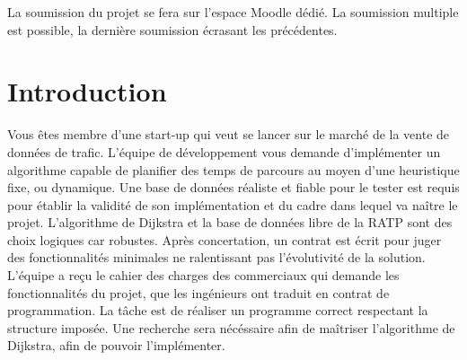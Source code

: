 \documentclass[9pts]{article}
\renewcommand{\headrulewidth}{0pt}
\begin{document}
La soumission du projet se fera sur l'espace Moodle dédié. La soumission multiple est possible, la dernière soumission écrasant les précédentes.

\pagebreak
\renewcommand{\headrulewidth}{0.5pt}
\fancyfoot[C]{\thepage}

\section{Introduction}
Vous êtes membre d'une start-up qui veut se lancer sur le marché de la vente de données de trafic.
L'équipe de développement vous demande d'implémenter un algorithme capable de planifier des temps de parcours au moyen d'une heuristique fixe, ou dynamique.
Une base de données réaliste et fiable pour le tester est requis pour établir la validité de son implémentation et du cadre dans lequel va naître le projet.
L'algorithme de Dijkstra et la base de données libre de la RATP sont des choix logiques car robustes.
Après concertation, un contrat est écrit pour juger des fonctionnalités minimales ne ralentissant pas l'évolutivité de la solution.
L'équipe a reçu le cahier des charges des commerciaux qui demande les fonctionnalités du projet, que les ingénieurs ont traduit en contrat de programmation. La tâche est de réaliser un programme correct respectant la structure imposée. Une recherche sera nécéssaire afin de maîtriser l'algorithme de Dijkstra, afin de pouvoir l'implémenter.
\end{document}
